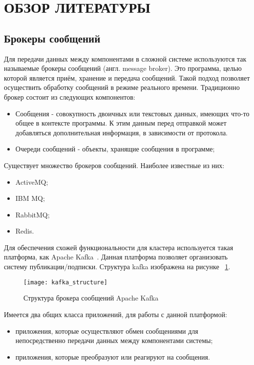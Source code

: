 \section{ОБЗОР ЛИТЕРАТУРЫ}
\label{sec:domain}

\subsection{Брокеры сообщений}

Для передачи данных между компонентами в сложной системе используются так называемые брокеры сообщений (англ. message broker).
Это программа, целью которой является приём, хранение и передача сообщений.
Такой подход позволяет осуществить обработку сообщений в режиме реального времени.
Традиционно брокер состоит из следующих компонентов:
\begin{itemize}
    \item Сообщения - совокупность двоичных или текстовых данных, имеющих что-то общее в контексте программы.
     К этим данным перед отправкой может добавляться дополнительная информация, в зависимости от протокола.
    \item Очереди сообщений - объекты, хранящие сообщения в программе;
\end{itemize}

Существует множество брокеров сообщений. Наиболее известные из них:
\begin{itemize}
    \item ActiveMQ;
    \item IBM MQ;
    \item RabbitMQ;
    \item Redis.
\end{itemize}

Для обеспечения схожей функциональности для кластера используется такая платформа, как Apache Kafka~\cite{kafka_documentation_intro}.
Данная платформа позволяет организовать систему публикации/подписки. 
Структура kafka изображена на рисунке ~\ref{pic:lit_review:kafka_structure}.

\begin{figure}
    \centering
    \texttt{[image: kafka\_structure]}
    \caption{Структура брокера сообщений  Apache Kafka~\cite{kafka_documentation_intro}}
    \label{pic:lit_review:kafka_structure}
\end{figure}

Имеется два общих класса приложений, для работы с данной платформой:
\begin{itemize}
    \item приложения, которые осуществляют обмен сообщениями для непосредственно передачи данных между компонентами системы;
    \item приложения, которые преобразуют или реагируют на сообщения.
\end{itemize}

